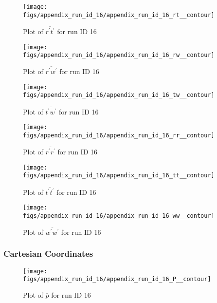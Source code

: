 \begin{figure}[H]
\centering
\texttt{[image: figs/appendix\_run\_id\_16/appendix\_run\_id\_16\_rt\_\_contour]}
\caption{Plot of $\overline{r^\prime t^\prime}$ for run ID 16}
\label{fig:appendix_run_id_16_rt__contour}
\end{figure}


\begin{figure}[H]
\centering
\texttt{[image: figs/appendix\_run\_id\_16/appendix\_run\_id\_16\_rw\_\_contour]}
\caption{Plot of $\overline{r^\prime w^\prime}$ for run ID 16}
\label{fig:appendix_run_id_16_rw__contour}
\end{figure}


\begin{figure}[H]
\centering
\texttt{[image: figs/appendix\_run\_id\_16/appendix\_run\_id\_16\_tw\_\_contour]}
\caption{Plot of $\overline{t^\prime w^\prime}$ for run ID 16}
\label{fig:appendix_run_id_16_tw__contour}
\end{figure}


\begin{figure}[H]
\centering
\texttt{[image: figs/appendix\_run\_id\_16/appendix\_run\_id\_16\_rr\_\_contour]}
\caption{Plot of $\overline{r^\prime r^\prime}$ for run ID 16}
\label{fig:appendix_run_id_16_rr__contour}
\end{figure}


\begin{figure}[H]
\centering
\texttt{[image: figs/appendix\_run\_id\_16/appendix\_run\_id\_16\_tt\_\_contour]}
\caption{Plot of $\overline{t^\prime t^\prime}$ for run ID 16}
\label{fig:appendix_run_id_16_tt__contour}
\end{figure}


\begin{figure}[H]
\centering
\texttt{[image: figs/appendix\_run\_id\_16/appendix\_run\_id\_16\_ww\_\_contour]}
\caption{Plot of $\overline{w^\prime w^\prime}$ for run ID 16}
\label{fig:appendix_run_id_16_ww__contour}
\end{figure}


\subsubsection{Cartesian Coordinates}
\begin{figure}[H]
\centering
\texttt{[image: figs/appendix\_run\_id\_16/appendix\_run\_id\_16\_P\_\_contour]}
\caption{Plot of $\overline{p}$ for run ID 16}
\label{fig:appendix_run_id_16_P__contour}
\end{figure}



